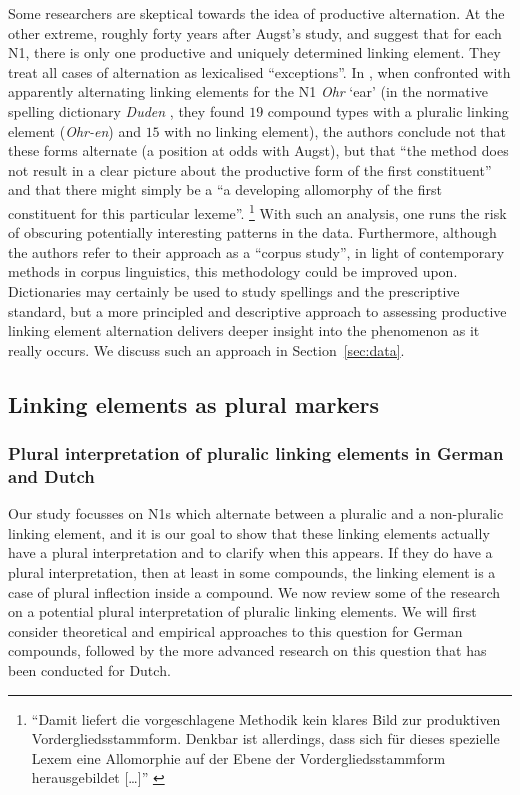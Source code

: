 Some researchers are skeptical towards the idea of productive alternation.
At the other extreme, roughly forty years after Augst's study, \textcite[31]{NeefBorgwaldt2012} and \textcite[46]{Neef2015} suggest that for each N1, there is only one productive and uniquely determined linking element.
They treat all cases of alternation as lexicalised ``exceptions''.
In \textcite[42]{NeefBorgwaldt2012}, when confronted with apparently alternating linking elements for the N1 \textit{Ohr} `ear' (in the normative spelling dictionary \textit{Duden} \citealt{Duden2006}, they found $19$ compound types with a pluralic linking element (\textit{Ohr-en}) and $15$ with no linking element), the authors conclude not that these forms alternate (a position at odds with Augst), but that ``the method does not result in a clear picture about the productive form of the first constituent'' and that there might simply be a ``a developing allomorphy of the first constituent for this particular lexeme''.%
\footnote{``Damit liefert die vorgeschlagene Methodik kein klares Bild zur produktiven Vordergliedsstammform.
	Denkbar ist allerdings, dass sich für dieses spezielle Lexem eine Allomorphie auf der Ebene der Vordergliedsstammform herausgebildet [\ldots]'' \parencite[31]{NeefBorgwaldt2012}}
With such an analysis, one runs the risk of obscuring potentially interesting patterns in the data.
Furthermore, although the authors refer to their approach as a ``corpus study'', in light of contemporary methods in corpus linguistics, this methodology could be improved upon.
Dictionaries may certainly be used to study spellings and the prescriptive standard, but a more principled and descriptive approach to assessing productive linking element alternation delivers deeper insight into the phenomenon as it really occurs.
We discuss such an approach in Section~\ref{sec:data}.


\subsection{Linking elements as plural markers}
\label{sec:linkagesaspluralmarkers}

\subsubsection{Plural interpretation of pluralic linking elements in German and Dutch}
\label{sec:pluralinterpretationofpluraliclinkagesingermananddutch}

Our study focusses on N1s which alternate between a pluralic and a non-pluralic linking element, and it is our goal to show that these linking elements actually have a plural interpretation and to clarify when this appears.
If they do have a plural interpretation, then at least in some compounds, the linking element is a case of plural inflection inside a compound.
We now review some of the research on a potential plural interpretation of pluralic linking elements.
We will first consider theoretical and empirical approaches to this question for German compounds, followed by the more advanced research on this question that has been conducted for Dutch.

